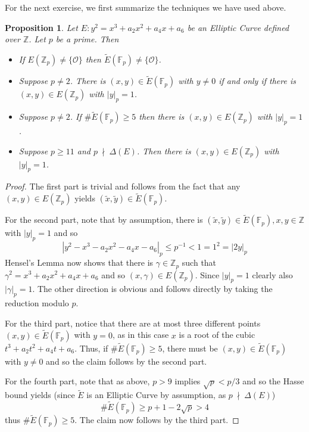 \documentclass{scrartcl}
\newcommand{\Z}{\mathbb{Z}}
\newcommand{\F}{\mathbb{F}}
\renewcommand{\O}{\mathcal{O}}
\newcommand{\notdivides}{\ \nmid \ }
\newtheorem{prop}{Proposition}
\theoremstyle{definition}
\begin{document}
For the next exercise, we first summarize the techniques we have used above.
\begin{prop}
    \label{prop:p_adic_points_techniques}
    Let $E: y^2 = x^3 + a_2 x^2 + a_4 x + a_6$ be an Elliptic Curve defined over $\Z$.
    Let $p$ be a prime.
    Then
    \begin{itemize}
        \item If $E(\Z_p) \neq \{\O\}$ then $\tilde{E}(\F_p) \neq \{\O\}$.
        \item Suppose $p \neq 2$. There is $(x, y) \in \tilde{E}(\F_p)$ with $y \neq 0$ if and only if there is $(x, y) \in E(\Z_p)$ with $|y|_p = 1$.
        \item Suppose $p \neq 2$. If $\#\tilde{E}(\F_p) \geq 5$ then there is $(x, y) \in E(\Z_p)$ with $|y|_p = 1$.
        \item Suppose $p \geq 11$ and $p \notdivides \Delta(E)$. Then there is $(x, y) \in E(\Z_p)$ with $|y|_p = 1$.
    \end{itemize}
\end{prop}
\begin{proof}
    The first part is trivial and follows from the fact that any $(x, y) \in E(\Z_p)$ yields $(\tilde{x}, \tilde{y}) \in \tilde{E}(\F_p)$.

    For the second part, note that by assumption, there is $(\tilde{x}, \tilde{y}) \in \tilde{E}(\F_p), x, y \in \Z$ with $|y|_p = 1$ and so
    \begin{equation*}
        |y^2 - x^3 - a_2 x^2 - a_4 x - a_6|_p \leq p^{-1} < 1 = 1^2 = |2y|_p
    \end{equation*}
    Hensel's Lemma now shows that there is $\gamma \in \Z_p$ such that $\gamma^2 = x^3 + a_2 x^2 + a_4 x + a_6$ and so $(x, \gamma) \in E(\Z_p)$.
    Since $|y|_p = 1$ clearly also $|\gamma|_p = 1$.
    The other direction is obvious and follows directly by taking the reduction modulo $p$.

    For the third part, notice that there are at most three different points $(x, y) \in \tilde{E}(\F_p)$ with $y = 0$, as in this case $x$ is a root of the cubic $t^3 + a_2 t^2 + a_4 t + a_6$.
    Thus, if $\#\tilde{E}(\F_p) \geq 5$, there must be $(x, y) \in \tilde{E}(\F_p)$ with $y \neq 0$ and so the claim follows by the second part.

    For the fourth part, note that as above, $p > 9$ implies $\sqrt{p} < p/3$ and so the Hasse bound yields (since $\tilde{E}$ is an Elliptic Curve by assumption, as $p \notdivides \Delta(E)$)
    \begin{equation*}
        \#\tilde{E}(\F_p) \geq p + 1 - 2\sqrt{p} > 4
    \end{equation*}
    thus $\#\tilde{E}(\F_p) \geq 5$. 
    The claim now follows by the third part.
\end{proof}
\end{document}
